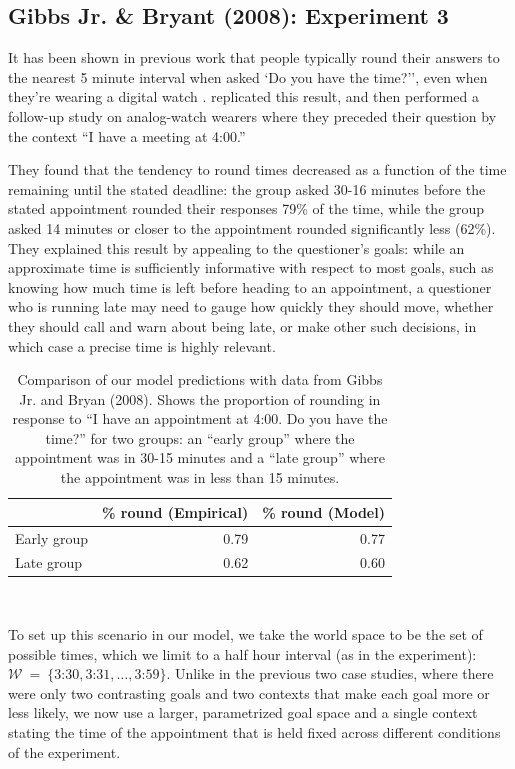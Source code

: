 \documentclass[12pt, floatsintext, jou]{apa6}
\begin{document}
\subsection{Gibbs Jr. \& Bryant (2008): Experiment 3}

It has been shown in previous work that people typically round their answers to the nearest 5 minute interval when asked `Do you have the time?'', even when they're wearing a digital watch \cite{DerHenstCarlesSperber02_RelevanceTellingTime}.   replicated this result, and then performed a follow-up study on analog-watch wearers where they preceded their question by the context ``I have a meeting at 4:00.'' 

They found that the tendency to round times decreased as a function of the time remaining until the stated deadline: the group asked 30-16 minutes before the stated appointment rounded their responses 79\% of the time, while the group asked 14 minutes or closer to the appointment rounded significantly less (62\%). They explained this result by appealing to the questioner's goals: while an approximate time is sufficiently informative with respect to most goals, such as knowing how much time is left before heading to an appointment, a questioner who is running late may need to gauge how quickly they should move, whether they should call and warn about being late, or make other such decisions, in which case a precise time is highly relevant. 
\begin{table}[t]
\centering
\begin{tabular}{ p{2cm} | r |||||| r }
&  \% round (Empirical) &  \% round (Model) \\
\hline
Early group &  0.79 & 0.77 \\
\hline
Late group     &0.62  & 0.60 \\
\end{tabular}
\\[1.5pt]
\caption{Comparison of our model predictions with data from Gibbs Jr. and Bryan (2008). Shows the proportion of rounding in response to ``I have an appointment at 4:00. Do you have the time?'' for two groups: an ``early group'' where the appointment was in 30-15 minutes and a ``late group'' where the appointment was in less than 15 minutes.} 
\label{table:gibbsJrExp3}
\end{table}
To set up this scenario in our model, we take the world space to be the set of possible times, which we limit to a half hour interval (as in the experiment): $\mathcal{W}~=~\{\textrm{3:30}, \textrm{3:31}, \dots, \textrm{3:59}\}$. Unlike in the previous two case studies, where there were only two contrasting goals and two contexts that make each goal more or less likely, we now use a larger, parametrized goal space and a single context stating the time of the appointment that is held fixed across different conditions of the experiment. 
\end{document}
